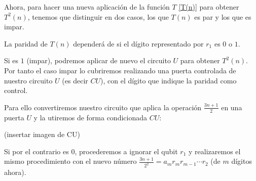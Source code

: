 Ahora, para hacer una nueva aplicación de la función $T$ \ref{T(n)} para obtener $T^2(n)$, tenemos que distinguir en dos casos, los que $T(n)$ es par y los que es impar.

La paridad de $T(n)$ dependerá de si el dígito representado por $r_1$ es $0$ o $1$.

Si es $1$ (impar), podremos aplicar de nuevo el circuito $U$ para obtener $T^2(n)$.
Por tanto el caso impar lo cubriremos realizando una puerta controlada de nuestro circuito $U$ (es decir $CU$), con el dígito que indique la paridad como control.

Para ello convertiremos nuestro circuito que aplica la operación $\frac{3n+1}{2}$ en una puerta $U$ y la utiremos de forma condicionada $CU$:

(insertar imagen de CU)


Si por el contrario es $0$, procederemos a ignorar el qubit $r_1$ y realizaremos el mismo procedimiento con el nuevo número $\frac{3n+1}{2^2} = a_m r_m r_{m-1} \cdots r_2$ (de $m$ dígitos ahora).


